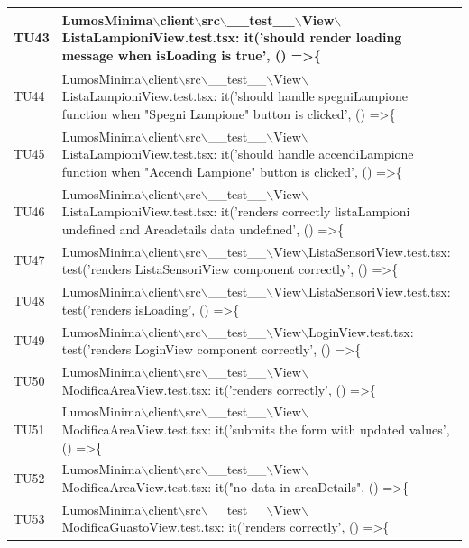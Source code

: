 \documentclass[12pt]{article}
\begin{document}
\begin{scriptsize}
\begin{xltabular}{\linewidth}{|>{\hsize}X|X|}
	TU43 & LumosMinima$\backslash$client$\backslash$src$\backslash$\_\_test\_\_$\backslash$View$\backslash$ListaLampioniView.test.tsx: it('should render loading message when isLoading is true', () =\textgreater \{ \\ \hline
	TU44 & LumosMinima$\backslash$client$\backslash$src$\backslash$\_\_test\_\_$\backslash$View$\backslash$ListaLampioniView.test.tsx: it('should handle spegniLampione function when "Spegni Lampione" button is clicked', () =\textgreater \{ \\ \hline
	TU45 & LumosMinima$\backslash$client$\backslash$src$\backslash$\_\_test\_\_$\backslash$View$\backslash$ListaLampioniView.test.tsx: it('should handle accendiLampione function when "Accendi Lampione" button is clicked', () =\textgreater \{ \\ \hline
	TU46 & LumosMinima$\backslash$client$\backslash$src$\backslash$\_\_test\_\_$\backslash$View$\backslash$ListaLampioniView.test.tsx: it('renders correctly listaLampioni undefined and Areadetails data undefined', () =\textgreater \{ \\ \hline
	TU47 & LumosMinima$\backslash$client$\backslash$src$\backslash$\_\_test\_\_$\backslash$View$\backslash$ListaSensoriView.test.tsx: test('renders ListaSensoriView component correctly', () =\textgreater \{ \\ \hline
	TU48 & LumosMinima$\backslash$client$\backslash$src$\backslash$\_\_test\_\_$\backslash$View$\backslash$ListaSensoriView.test.tsx: test('renders isLoading', () =\textgreater \{ \\ \hline
	TU49 & LumosMinima$\backslash$client$\backslash$src$\backslash$\_\_test\_\_$\backslash$View$\backslash$LoginView.test.tsx: test('renders LoginView component correctly', () =\textgreater \{ \\ \hline
	TU50 & LumosMinima$\backslash$client$\backslash$src$\backslash$\_\_test\_\_$\backslash$View$\backslash$ModificaAreaView.test.tsx: it('renders correctly', () =\textgreater \{ \\ \hline
	TU51 & LumosMinima$\backslash$client$\backslash$src$\backslash$\_\_test\_\_$\backslash$View$\backslash$ModificaAreaView.test.tsx: it('submits the form with updated values', () =\textgreater \{ \\ \hline
	TU52 & LumosMinima$\backslash$client$\backslash$src$\backslash$\_\_test\_\_$\backslash$View$\backslash$ModificaAreaView.test.tsx: it("no data in areaDetails", () =\textgreater \{ \\ \hline
	TU53 & LumosMinima$\backslash$client$\backslash$src$\backslash$\_\_test\_\_$\backslash$View$\backslash$ModificaGuastoView.test.tsx: it('renders correctly', () =\textgreater \{ \\ \hline

\end{xltabular}
\end{scriptsize}
\end{document}
